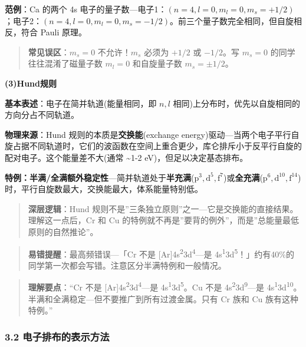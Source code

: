 \textbf{范例}：Ca 的两个 4s 电子的量子数---电子1：\((n=4,l=0,m_l=0,m_s=+1/2)\)；电子2：\((n=4,l=0,m_l=0,m_s=-1/2)\)。前三个量子数完全相同，但自旋相反，符合 Pauli 原理。

\begin{quote}
\textbf{常见误区}：\(m_s=0\) 不允许！\(m_s\) 必须为 \(+1/2\) 或 \(-1/2\)。写 \(m_s=0\) 的同学往往混淆了磁量子数 \(m_l=0\) 和自旋量子数 \(m_s=±1/2\)。
\end{quote}

\textbf{(3)Hund规则}

\textbf{基本表述}：电子在简并轨道(能量相同，即 \(n,l\) 相同)上分布时，优先以自旋相同的方向分占不同轨道。

\textbf{物理来源}：Hund 规则的本质是\textbf{交换能}(exchange energy)驱动---当两个电子平行自旋占据不同轨道时，它们的波函数在空间上重合更少，库仑排斥小于反平行自旋的配对电子。这个能量差不大(通常 \textasciitilde1-2 eV)，但足以决定基态排布。

\textbf{特例：半满/全满额外稳定性}---简并轨道处于\textbf{半充满}(\(\mathrm{p^3, d^5, f^7}\))或\textbf{全充满}(\(\mathrm{p^6, d^{10}, f^{14}}\))时，平行自旋数最大，交换能最大，体系能量特别低。

\begin{quote}
\textbf{深层逻辑}：Hund 规则不是''三条独立原则''之一---它是交换能的直接结果。理解这一点后，Cr 和 Cu 的特例就不再是''要背的例外''，而是''总能量最低原则的自然推论''。
\end{quote}

\begin{quote}
\textbf{易错提醒}：最高频错误---「Cr 不是 {[}Ar{]}4s\textsuperscript{2}3d\textsuperscript{4}---是 4s\textsuperscript{1}3d\textsuperscript{5}！」约有40\%的同学第一次都会写错。注意区分半满特例和一般情况。
\end{quote}

\begin{quote}
\textbf{理解要点}：``Cr 不是 {[}Ar{]}4s\textsuperscript{2}3d\textsuperscript{4}---是 4s\textsuperscript{1}3d\textsuperscript{5}。Cu 不是 4s\textsuperscript{2}3d\textsuperscript{9}---是 4s\textsuperscript{1}3d\textsuperscript{10}。半满和全满稳定---但不要推广到所有过渡金属。只有 Cr 族和 Cu 族有这种特例。''
\end{quote}

\subsubsection{3.2 电子排布的表示方法}\label{ux7535ux5b50ux6392ux5e03ux7684ux8868ux793aux65b9ux6cd5}

